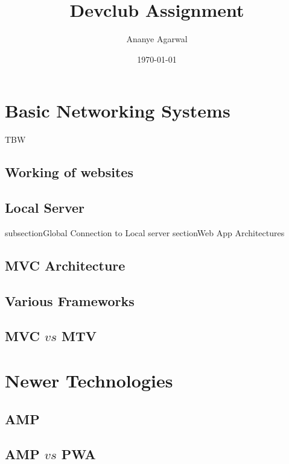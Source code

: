 \documentclass[a4paper]{article}
\title{Devclub Assignment}
\author{Ananye Agarwal}
\date{\today}
\begin{document}
\maketitle


\section{Basic Networking Systems}
TBW
\label{sec:introduction}
\subsection{Working of websites}
 \cite{}
\subsection{Local Server}
subsection{Global Connection to Local server}
section{Web App Architectures}
\label{sec:theory}

\subsection{MVC Architecture}

\subsection{Various Frameworks}

        \subsection{MVC $vs$ MTV}
 \section{Newer Technologies}
\subsection{AMP}
\subsection{AMP $vs$ PWA}
\end{document}
